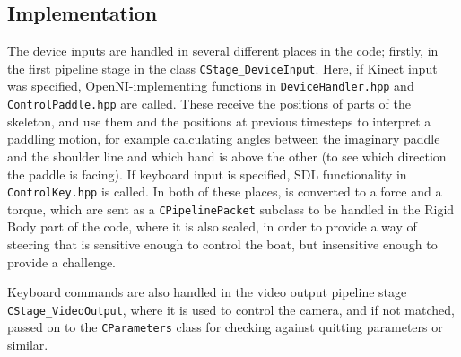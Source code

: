 \subsection{Implementation}
The device inputs are handled in several different places in the code; firstly, in the first pipeline stage in the class \texttt{CStage_DeviceInput}. Here, if Kinect input was specified, OpenNI-implementing functions in \texttt{DeviceHandler.hpp} and \texttt{ControlPaddle.hpp} are called. These receive the positions of parts of the skeleton, and use them and the positions at previous timesteps to interpret a paddling motion, for example calculating angles between the imaginary paddle and the shoulder line and which hand is above the other (to see which direction the paddle is facing). If keyboard input is specified, SDL functionality in \texttt{ControlKey.hpp} is called. In both of these places, is converted to a force and a torque, which are sent as a \texttt{CPipelinePacket} subclass to be handled in the Rigid Body part of the code, where it is also scaled, in order to provide a way of steering that is sensitive enough to control the boat, but insensitive enough to provide a challenge.

Keyboard commands are also handled in the video output pipeline stage \texttt{CStage_VideoOutput}, where it is used to control the camera, and if not matched, passed on to the \texttt{CParameters} class for checking against quitting parameters or similar.


